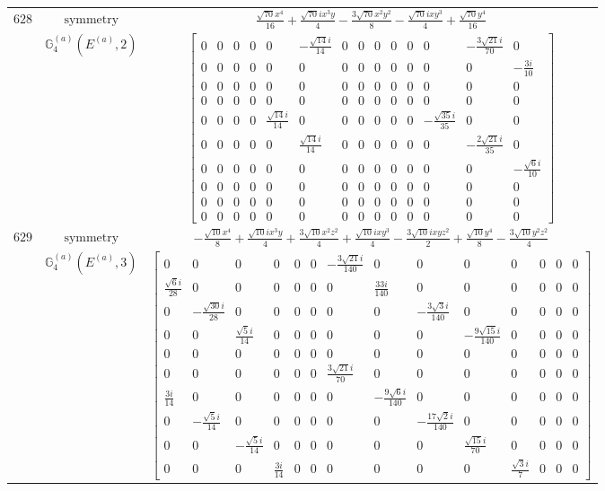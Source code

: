 \documentclass[fleqn,8pt,landscape]{jsarticle}
\begin{document}
\begin{longtable}{ccc}
$ 628 $ & $ \text{symmetry} $ & $ \frac{\sqrt{70} x^{4}}{16} + \frac{\sqrt{70} i x^{3} y}{4} - \frac{3 \sqrt{70} x^{2} y^{2}}{8} - \frac{\sqrt{70} i x y^{3}}{4} + \frac{\sqrt{70} y^{4}}{16} $ \\
$  $ & $ \mathbb{G}_{4}^{(a)}(E^{(a)},2) $ & $ \begin{bmatrix} 0 & 0 & 0 & 0 & 0 & - \frac{\sqrt{14} i}{14} & 0 & 0 & 0 & 0 & 0 & 0 & - \frac{3 \sqrt{21} i}{70} & 0 \\ 0 & 0 & 0 & 0 & 0 & 0 & 0 & 0 & 0 & 0 & 0 & 0 & 0 & - \frac{3 i}{10} \\ 0 & 0 & 0 & 0 & 0 & 0 & 0 & 0 & 0 & 0 & 0 & 0 & 0 & 0 \\ 0 & 0 & 0 & 0 & 0 & 0 & 0 & 0 & 0 & 0 & 0 & 0 & 0 & 0 \\ 0 & 0 & 0 & 0 & \frac{\sqrt{14} i}{14} & 0 & 0 & 0 & 0 & 0 & 0 & - \frac{\sqrt{35} i}{35} & 0 & 0 \\ 0 & 0 & 0 & 0 & 0 & \frac{\sqrt{14} i}{14} & 0 & 0 & 0 & 0 & 0 & 0 & - \frac{2 \sqrt{21} i}{35} & 0 \\ 0 & 0 & 0 & 0 & 0 & 0 & 0 & 0 & 0 & 0 & 0 & 0 & 0 & - \frac{\sqrt{6} i}{10} \\ 0 & 0 & 0 & 0 & 0 & 0 & 0 & 0 & 0 & 0 & 0 & 0 & 0 & 0 \\ 0 & 0 & 0 & 0 & 0 & 0 & 0 & 0 & 0 & 0 & 0 & 0 & 0 & 0 \\ 0 & 0 & 0 & 0 & 0 & 0 & 0 & 0 & 0 & 0 & 0 & 0 & 0 & 0 \end{bmatrix} $ \\ \hline
$ 629 $ & $ \text{symmetry} $ & $ - \frac{\sqrt{10} x^{4}}{8} + \frac{\sqrt{10} i x^{3} y}{4} + \frac{3 \sqrt{10} x^{2} z^{2}}{4} + \frac{\sqrt{10} i x y^{3}}{4} - \frac{3 \sqrt{10} i x y z^{2}}{2} + \frac{\sqrt{10} y^{4}}{8} - \frac{3 \sqrt{10} y^{2} z^{2}}{4} $ \\
$  $ & $ \mathbb{G}_{4}^{(a)}(E^{(a)},3) $ & $ \begin{bmatrix} 0 & 0 & 0 & 0 & 0 & 0 & - \frac{3 \sqrt{21} i}{140} & 0 & 0 & 0 & 0 & 0 & 0 & 0 \\ \frac{\sqrt{6} i}{28} & 0 & 0 & 0 & 0 & 0 & 0 & \frac{33 i}{140} & 0 & 0 & 0 & 0 & 0 & 0 \\ 0 & - \frac{\sqrt{30} i}{28} & 0 & 0 & 0 & 0 & 0 & 0 & - \frac{3 \sqrt{3} i}{140} & 0 & 0 & 0 & 0 & 0 \\ 0 & 0 & \frac{\sqrt{5} i}{14} & 0 & 0 & 0 & 0 & 0 & 0 & - \frac{9 \sqrt{15} i}{140} & 0 & 0 & 0 & 0 \\ 0 & 0 & 0 & 0 & 0 & 0 & 0 & 0 & 0 & 0 & 0 & 0 & 0 & 0 \\ 0 & 0 & 0 & 0 & 0 & 0 & \frac{3 \sqrt{21} i}{70} & 0 & 0 & 0 & 0 & 0 & 0 & 0 \\ \frac{3 i}{14} & 0 & 0 & 0 & 0 & 0 & 0 & - \frac{9 \sqrt{6} i}{140} & 0 & 0 & 0 & 0 & 0 & 0 \\ 0 & - \frac{\sqrt{5} i}{14} & 0 & 0 & 0 & 0 & 0 & 0 & - \frac{17 \sqrt{2} i}{140} & 0 & 0 & 0 & 0 & 0 \\ 0 & 0 & - \frac{\sqrt{5} i}{14} & 0 & 0 & 0 & 0 & 0 & 0 & \frac{\sqrt{15} i}{70} & 0 & 0 & 0 & 0 \\ 0 & 0 & 0 & \frac{3 i}{14} & 0 & 0 & 0 & 0 & 0 & 0 & \frac{\sqrt{3} i}{7} & 0 & 0 & 0 \end{bmatrix} $ \\ \hline

\end{longtable}
\end{document}
